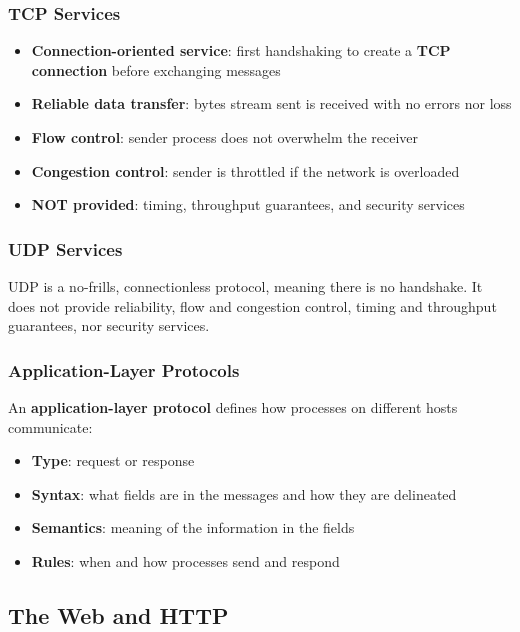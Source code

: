 \documentclass{article}
\begin{document}
\subsubsection*{TCP Services}
\begin{itemize}
    \item \textbf{Connection-oriented service}: first handshaking to create a \textbf{TCP connection} before exchanging messages
    \item \textbf{Reliable data transfer}: bytes stream sent is received with no errors nor loss
    \item \textbf{Flow control}: sender process does not overwhelm the receiver
    \item \textbf{Congestion control}: sender is throttled if the network is overloaded
    \item \textbf{NOT provided}: timing, throughput guarantees, and security services
\end{itemize}
\subsubsection*{UDP Services}
UDP is a no-frills, connectionless protocol, meaning there is no handshake.
It does not provide reliability, flow and congestion control, timing and throughput guarantees, nor security services.
\subsubsection{Application-Layer Protocols}
An \textbf{application-layer protocol} defines how processes on different hosts communicate:
\begin{itemize}
    \item \textbf{Type}: request or response
    \item \textbf{Syntax}: what fields are in the messages and how they are delineated
    \item \textbf{Semantics}: meaning of the information in the fields
    \item \textbf{Rules}: when and how processes send and respond
\end{itemize}

\subsection{The Web and HTTP}
\end{document}
